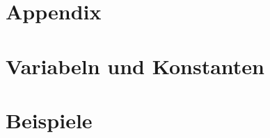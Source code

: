 \documentclass[numerate]{cheatsheet}
\begin{document}
\section{Appendix}
    
    
    \vfill \null \columnbreak

\section{Variabeln und Konstanten}
    
    
    \vfill \null \columnbreak

    
    
    
    \newpage

\section{Beispiele}
    
    \vfill \null \columnbreak
    
\end{document}
